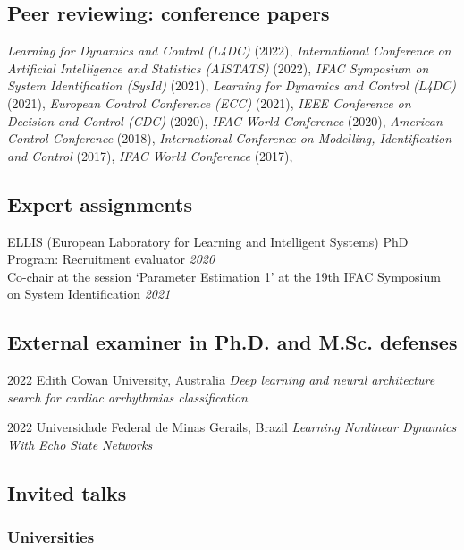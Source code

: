 \documentclass[10pt,letterpaper]{article} %
\begin{document}
\subsection*{Peer reviewing: conference papers}

 {\em Learning for Dynamics and Control (L4DC) } (2022),  {\em International Conference on Artificial Intelligence and Statistics (AISTATS) } (2022),  {\em IFAC Symposium on System Identification (SysId) } (2021),  {\em Learning for Dynamics and Control (L4DC) } (2021),  {\em European Control Conference (ECC) } (2021),  {\em IEEE Conference on Decision and Control (CDC) } (2020),  {\em IFAC World Conference } (2020),  {\em American Control Conference } (2018),  {\em International Conference on Modelling, Identification and Control } (2017),  {\em IFAC World Conference } (2017), 

\subsection*{Expert assignments}

 ELLIS (European Laboratory for Learning and Intelligent Systems) PhD Program: Recruitment evaluator \hfill {\em 2020 } \\  Co-chair at the session `Parameter Estimation 1' at the 19th IFAC Symposium on System Identification \hfill {\em 2021 } \\ 

\subsection*{External examiner in Ph.D. and M.Sc. defenses}


    { 2022 }
    {  }
    { Edith Cowan University, Australia }
    { {\it Deep learning and neural architecture search for cardiac arrhythmias classification } }

    { 2022 }
    {  }
    { Universidade Federal de Minas Gerails, Brazil }
    { {\it Learning Nonlinear Dynamics With Echo State Networks } }



\subsection*{Invited talks}

\subsubsection*{Universities}
\end{document}
